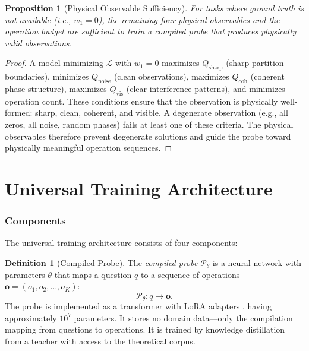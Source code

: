 \documentclass[11pt,twocolumn,a4paper]{article}
\newtheorem{proposition}[theorem]{Proposition}
\theoremstyle{definition}
\newtheorem{definition}[theorem]{Definition}
\theoremstyle{remark}
\newcommand{\loss}{\mathcal{L}}
\newcommand{\params}{\theta}
\newcommand{\probe}{\mathcal{P}}
\newcommand{\Qsharp}{Q_{\mathrm{sharp}}}
\newcommand{\Qnoise}{Q_{\mathrm{noise}}}
\newcommand{\Qcoh}{Q_{\mathrm{coh}}}
\newcommand{\Qvis}{Q_{\mathrm{vis}}}
\begin{document}
\begin{proposition}[Physical Observable Sufficiency]
\label{prop:phys_obs_sufficiency}
For tasks where ground truth is not available (i.e., $w_1 = 0$), the remaining four physical observables and the operation budget are sufficient to train a compiled probe that produces physically valid observations.
\end{proposition}

\begin{proof}
A model minimizing $\loss$ with $w_1 = 0$ maximizes $\Qsharp$ (sharp partition boundaries), minimizes $\Qnoise$ (clean observations), maximizes $\Qcoh$ (coherent phase structure), maximizes $\Qvis$ (clear interference patterns), and minimizes operation count. These conditions ensure that the observation is physically well-formed: sharp, clean, coherent, and visible. A degenerate observation (e.g., all zeros, all noise, random phases) fails at least one of these criteria. The physical observables therefore prevent degenerate solutions and guide the probe toward physically meaningful operation sequences.
\end{proof}



\part{Universal Training Architecture}

\section{Components}
\label{sec:components}

The universal training architecture consists of four components:

\begin{definition}[Compiled Probe]
\label{def:compiled_probe}
The \emph{compiled probe} $\probe_\params$ is a neural network with parameters $\params$ that maps a question $q$ to a sequence of operations $\mathbf{o} = (o_1, o_2, \ldots, o_K)$:
\[
\probe_\params: q \mapsto \mathbf{o}.
\]
The probe is implemented as a transformer \citep{vaswani2017} with LoRA adapters \citep{hu2022}, having approximately $10^7$ parameters. It stores no domain data---only the compilation mapping from questions to operations. It is trained by knowledge distillation \citep{hinton2015} from a teacher with access to the theoretical corpus.
\end{definition}
\end{document}
